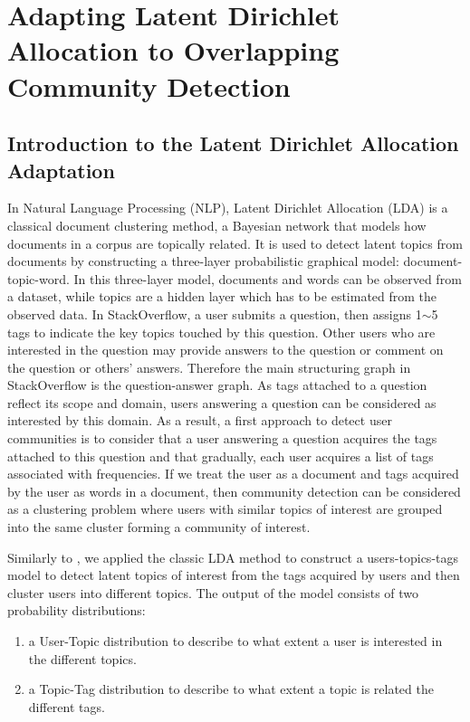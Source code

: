 \chapter{Adapting Latent Dirichlet Allocation to Overlapping Community Detection}
\doublespacing
\label{chap:lda}
\minitoc

\section{Introduction to the Latent Dirichlet Allocation Adaptation}
In Natural Language Processing (NLP), Latent Dirichlet Allocation (LDA) \cite{blei2003latent} is a classical document clustering method, a Bayesian network that models how documents in a corpus are topically related.
It is used to detect latent topics from documents by constructing a three-layer probabilistic graphical model: document-topic-word. In this three-layer model, documents and words can be observed from a dataset, while topics are a hidden layer which has to be estimated from the observed data.  
In StackOverflow, a user submits a question, then assigns 1$\sim$5 tags to indicate the key topics touched by this question. Other users who are interested in the question may provide answers to the question or comment on the question or others' answers. Therefore the main structuring graph in StackOverflow is the question-answer graph. As tags attached to a question  reflect its scope and domain, users answering a question can be considered as interested by this domain. As a result, a first approach to detect user communities is to consider that a user answering a question acquires the tags attached to this question and that gradually, each user acquires a list of tags associated with frequencies. If we treat the user as a document and tags acquired by the user as words in a document, then community detection can be considered as a clustering problem where users with similar topics of interest are grouped into the same cluster forming a community of interest.

Similarly to \cite{Li:2010:CTM:1871437.1871673}, we applied the classic LDA method to construct a users-topics-tags model to detect latent topics of interest from the tags acquired by users and then cluster users into different topics. The output of the model consists of two probability distributions:
\begin{enumerate}
 \item a User-Topic distribution to describe to what extent a user is interested in the different topics.
 \item a Topic-Tag distribution to describe to what extent a topic is related the different tags.
\end{enumerate}



